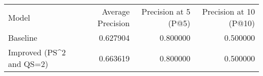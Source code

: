 \begin{tabular}{lrrr}
Model & Average Precision & Precision at 5 (P@5) & Precision at 10 (P@10) \\
Baseline & 0.627904 & 0.800000 & 0.500000 \\
Improved (PS^2 and QS=2) & 0.663619 & 0.800000 & 0.500000 \\
\end{tabular}
